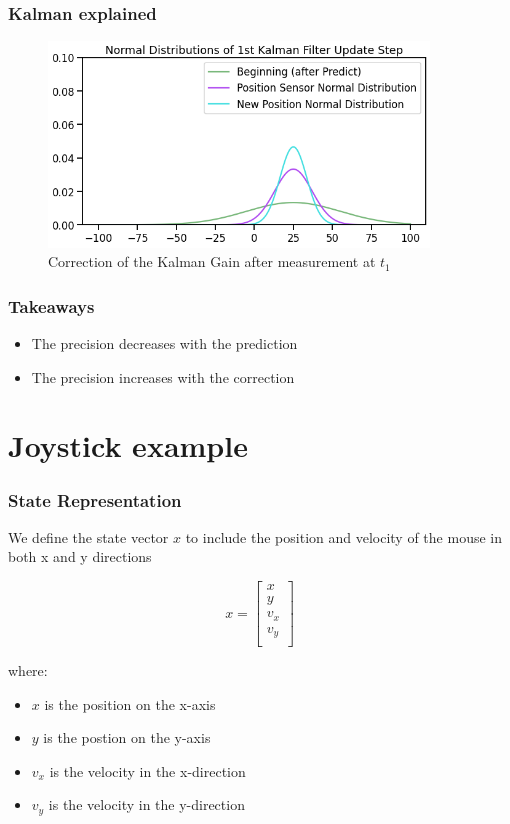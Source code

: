 \documentclass{beamer}
\begin{document}
\begin{frame}
    \frametitle{Kalman explained}
    \begin{figure}
        \centering
        \includegraphics[width=0.9\textwidth]{images/05_correction.png}
        \caption{Correction of the Kalman Gain after measurement at \(t_1\)}
    \end{figure}
\end{frame}

\begin{frame}
    \frametitle{Takeaways}
    \begin{itemize}
        \item The precision decreases with the prediction
        \item The precision increases with the correction
    \end{itemize}

\end{frame}

\section{Joystick example}

\begin{frame}
    \frametitle{State Representation}
    We define the state vector \(x\) to include the position and velocity of the mouse in both x and y directions

    \begin{equation*}
        x = \begin{bmatrix}
            x     \\
            y     \\
            v_{x} \\
            v_{y} \\
        \end{bmatrix}
    \end{equation*}

    where:
    \begin{itemize}
        \item \(x\) is the position on the x-axis
        \item \(y\) is the postion on the y-axis
        \item \(v_{x}\) is the velocity in the x-direction
        \item \(v_{y}\) is the velocity in the y-direction

    \end{itemize}
\end{frame}
\end{document}
